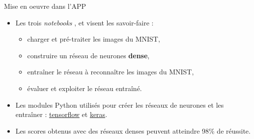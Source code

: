 \documentclass[10pt,serif,mathserif,compress,hyperref={colorlinks}]{beamer}
\begin{document}
\begin{frame}{Mise en oeuvre dans l'APP}

  \begin{tcolorbox}[title=1 -- Auto-formation/ Réseau dense]
    \begin{itemize}
    \item Les trois {\em notebooks} ,
       et  visent les savoir-faire :
      \begin{itemize}
      \item charger et pré-traiter les images du MNIST,
      \item construire un réseau de neurones {\bf dense},
      \item entraîner le réseau à reconnaître les images du MNIST,
      \item évaluer et exploiter le réseau entraîné.
      \end{itemize}
      
    \item Les modules Python utilisés pour créer les réseaux de neurones et les entraîner : \href{https://www.tensorflow.org/tutorials}{tensorflow}
      et \href{https://www.tensorflow.org/versions/r2.4/api_docs/python/tf}{keras}.
    \item Les scores obtenus avec des réseaux denses peuvent atteindre 98\% de réussite.
    \end{itemize}
  \end{tcolorbox}

\end{frame}
\end{document}
